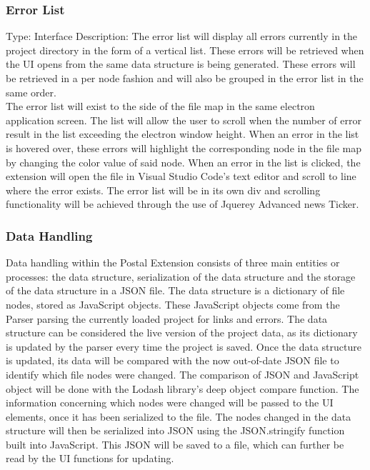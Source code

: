 \documentclass[letterpaper,10pt,titlepage,draftclsnofoot,onecolumn,onesided] {IEEEtran}
\begin{document}
	\subsubsection{Error List}
	Type: Interface
	Description: 
	The error list will display all errors currently in the project directory in the form of a vertical list. 
	These errors will be retrieved when the UI opens from the same data structure is being generated. 
	These errors will be retrieved in a per node fashion and will also be grouped in the error list in the same order. 
	\\
	The error list will exist to the side of the file map in the same electron application screen. 
	The list will allow the user to scroll when the number of error result in the list exceeding the electron window height. 
	When an error in the list is hovered over, these errors will highlight the corresponding node in the file map by changing the color value of said node. 
	When an error in the list is clicked, the extension will open the file in Visual Studio Code's text editor and scroll to line where the error exists.
	The error list will be in its own div and scrolling functionality will be achieved through the use of Jquerey Advanced news Ticker.
	
	\subsubsection{Data Handling}
	Data handling within the Postal Extension consists of three main entities or processes: the data structure, serialization of the data structure and the storage of the data structure in a JSON file.
	The data structure is a dictionary of file nodes, stored as JavaScript objects. These JavaScript objects come from the Parser parsing the currently loaded project for links and errors.
	The data structure can be considered the live version of the project data, as its dictionary is updated by the parser every time the project is saved. 
	Once the data structure is updated, its data will be compared with the now out-of-date JSON file to identify which file nodes were changed.
	The comparison of JSON and JavaScript object will be done with the Lodash library's deep object compare function.
	The information concerning which nodes were changed will be passed to the UI elements, once it has been serialized to the file.
	The nodes changed in the data structure will then be serialized into JSON using the JSON.stringify function built into JavaScript.
	This JSON will be saved to a file, which can further be read by the UI functions for updating.
	
\end{document}
